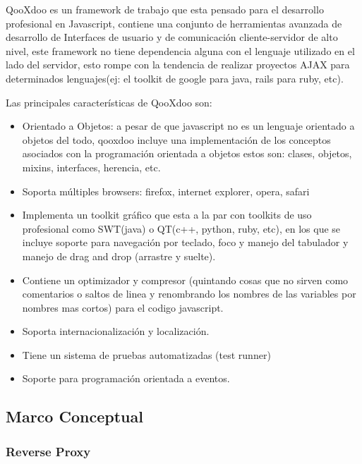 QooXdoo es un framework de trabajo que esta pensado para el desarrollo profesional en Javascript, contiene una conjunto de herramientas avanzada de desarrollo de Interfaces de usuario y de comunicación cliente-servidor de alto nivel, este framework no tiene dependencia alguna con el lenguaje utilizado en el lado del servidor, esto rompe con la tendencia de realizar proyectos AJAX para determinados lenguajes(ej: el toolkit de google para java, rails para ruby, etc).

Las principales características de QooXdoo son:

\begin{itemize}

	\item Orientado a Objetos: a pesar de que javascript no es un lenguaje orientado a objetos del todo, qooxdoo incluye una implementación de los conceptos asociados con la programación orientada a objetos estos son: clases, objetos, mixins, interfaces, herencia, etc.
	
	\item Soporta múltiples browsers: firefox, internet explorer, opera, safari
	\item Implementa un toolkit gráfico que esta a la par con toolkits de uso profesional como SWT(java) o QT(c++, python, ruby, etc), en los que se incluye soporte para navegación por teclado, foco y manejo del tabulador y manejo de drag and drop (arrastre y suelte).
	\item Contiene un optimizador y compresor (quintando cosas que no sirven como comentarios o saltos de linea y renombrando los nombres de las variables por nombres mas cortos) para el codigo javascript.
	\item Soporta internacionalización y localización.
	\item Tiene un sistema de pruebas automatizadas (test runner)
	\item Soporte para programación orientada a eventos.

\end{itemize}


\subsection{Marco Conceptual}

\subsubsection*{Reverse Proxy}


